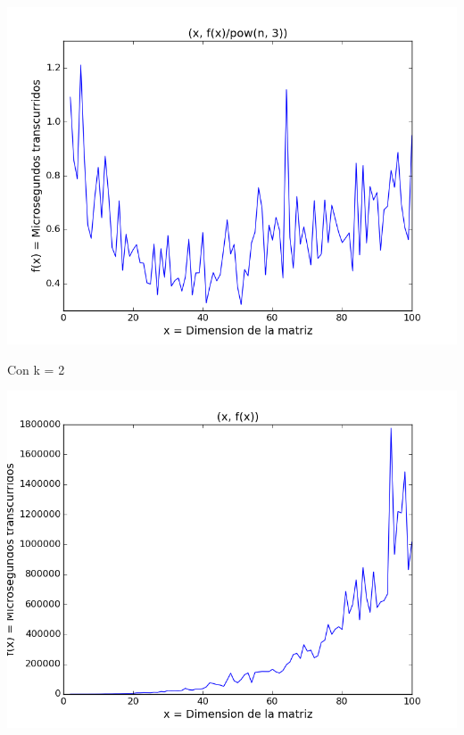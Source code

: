 \begin{center}
\includegraphics[scale=0.54]{images/1potenciasobrecubo}
\end{center}


\vspace{2mm}

Con k = 2


\begin{center}
\includegraphics[scale=0.54]{images/2potenciafuncion}
\end{center}


